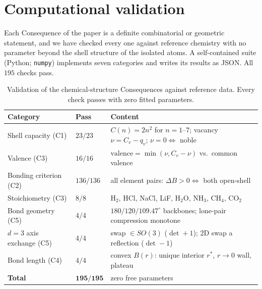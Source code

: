 \documentclass[11pt,twocolumn,a4paper]{article}
\theoremstyle{thmstyle}
\theoremstyle{definition}
\theoremstyle{remark}
\newcommand{\thick}{B}                 %
\newcommand{\Shellcap}{C}
\begin{document}
\section{Computational validation}
\label{sec:validation}

Each Consequence of the paper is a definite combinatorial or geometric
statement, and we have checked every one against reference chemistry with
no parameter beyond the shell structure of the isolated atoms. A
self-contained suite (Python; \texttt{numpy}) implements seven categories
and writes its results as JSON. All $195$ checks pass.

\begin{table}[h]
\centering\small
\caption{Validation of the chemical-structure Consequences against
reference data. Every check passes with zero fitted parameters.}
\label{tab:validation}
\begin{tabular}{lll}
\toprule
\textbf{Category} & \textbf{Pass} & \textbf{Content}\\
\midrule
Shell capacity (C1)        & $23/23$  & $\Shellcap(n)=2n^2$ for $n=1$--$7$;
                                        vacancy $\nu=\Shellcap_v-q_v$; $\nu=0\iff$ noble\\
Valence (C3)               & $16/16$  & $\mathrm{valence}=\min(\nu,\Shellcap_v-\nu)$
                                        vs.\ common valence\\
Bonding criterion (C2)     & $136/136$& all element pairs:
                                        $\Delta\thick>0\iff$ both open-shell\\
Stoichiometry (C3)         & $8/8$    & H$_2$, HCl, NaCl, LiF, H$_2$O,
                                        NH$_3$, CH$_4$, CO$_2$\\
Bond geometry (C5)         & $4/4$    & $180/120/109.47^\circ$ backbones;
                                        lone-pair compression monotone\\
$d{=}3$ axis exchange (C5) & $4/4$    & swap $\in SO(3)$ ($\det+1$);
                                        2D swap a reflection ($\det-1$)\\
Bond length (C4)           & $4/4$    & convex $\thick(r)$: unique interior
                                        $r^{*}$, $r{\to}0$ wall, plateau\\
\midrule
\textbf{Total}             & $\mathbf{195/195}$ & zero free parameters\\
\bottomrule
\end{tabular}
\end{table}
\end{document}
